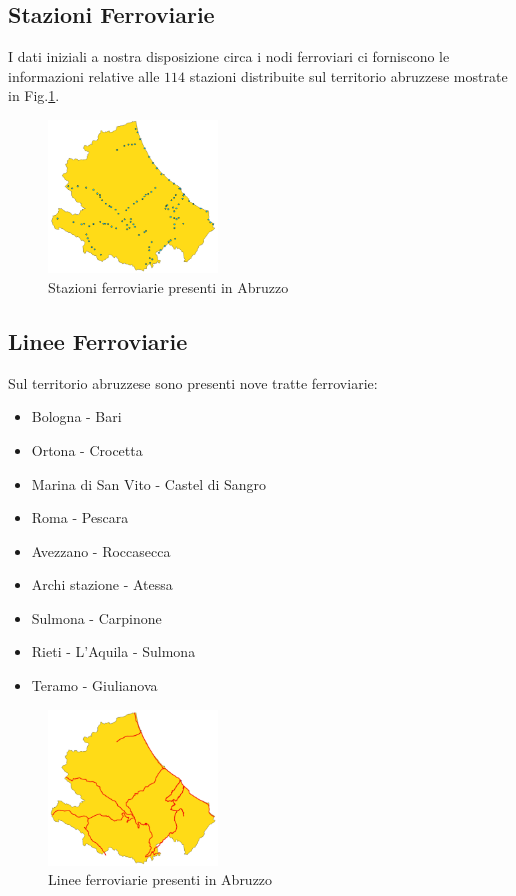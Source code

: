 \subsection{Stazioni Ferroviarie}
I dati iniziali a nostra disposizione circa i nodi ferroviari ci forniscono le informazioni relative alle $114$ stazioni distribuite sul territorio abruzzese mostrate in Fig.\ref{fig:regioneStazione}.
\newpage
\begin{figure}[h]
	\centering
	\includegraphics[width=0.4\textwidth]{img/regioneStazione}
	\caption{Stazioni ferroviarie presenti in Abruzzo}
    \label{fig:regioneStazione}
\end{figure}

\subsection{Linee Ferroviarie}
Sul territorio abruzzese sono presenti nove tratte ferroviarie:
\begin{itemize}
\item Bologna - Bari
\item Ortona - Crocetta
\item Marina di San Vito - Castel di Sangro
\item Roma - Pescara
\item Avezzano - Roccasecca
\item Archi stazione - Atessa
\item Sulmona - Carpinone
\item Rieti - L'Aquila - Sulmona
\item Teramo - Giulianova
\end{itemize}

\begin{figure}[h]
	\centering
	\includegraphics[width=0.4\textwidth]{img/regioneFerrovia}
	\caption{Linee ferroviarie presenti in Abruzzo}
    \label{fig:regioneFerrovia}
\end{figure}

